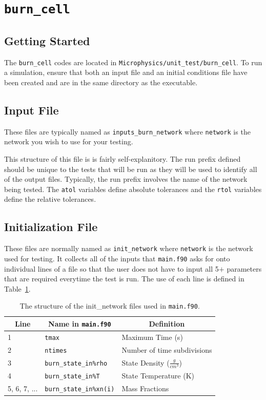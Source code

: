 \section{{\tt burn\_cell}}

\subsection{Getting Started}

The {\tt burn\_cell} codes are located in {\tt Microphysics/unit\_test/burn\_cell}. To run a simulation, ensure that both an input file and an initial conditions file have been created and are in the same directory as the executable. 

\subsection{Input File}

These files are typically named as {\tt inputs\_burn\_network} where {\tt network} is the network you wish to use for your testing.

This structure of this file is is fairly self-explanitory.
The run prefix defined should be unique to the tests that will be run as they will be used to identify all of the output files. Typically, the run prefix involves the name of the network being tested. 
The {\tt atol} variables define absolute tolerances and the {\tt rtol} variables define the relative tolerances. 

\subsection{Initialization File}

These files are normally named as {\tt init\_network} where {\tt network} is the network used for testing. 
It collects all of the inputs that {\tt main.f90} asks for onto individual lines of a file so that the user does not have to input all 5$+$ parameters that are required everytime the test is run. 
The use of each line is defined in Table~\ref{tab:init-structure}.

\begin{table}
	\centering
	\begin{tabular}{|l|l|l|}
		\hline
			\multicolumn{1}{|c|}{\textbf{Line}} &
			\multicolumn{1}{|c|}{\textbf{Name in {\tt main.f90}}} &
			\multicolumn{1}{|c|}{\textbf{Definition}} \\
		\hline
		\rowcolor{tableShade}
		1 & {\tt tmax} & Maximum Time (s) \\
		2 & {\tt ntimes} & Number of time subdivisions \\
		\rowcolor{tableShade}
		3 & {\tt burn\_state\_in\%rho} & State Density ($\frac{g}{cm^3}$) \\
		4 & {\tt burn\_state\_in\%T} & State Temperature (K) \\
		\rowcolor{tableShade}
		5, 6, 7, ... & {\tt burn\_state\_in\%xn(i)} & Mass Fractions \\
		\hline
	\end{tabular}
	\caption{The structure of the init\_network files used in {\tt main.f90}.}
	\label{tab:init-structure}
\end{table}

